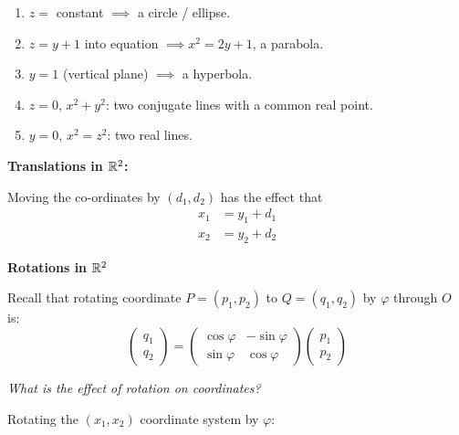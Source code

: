 \documentclass[10pt]{scrartcl}
\begin{document}
\begin{enumerate}
\item $z = $ constant $ \implies$ a circle / ellipse.
\item $z = y + 1$ into equation $\implies x^2 = 2y + 1$, a parabola.	
\item $y=1$ (vertical plane) $\implies$ a hyperbola.
\item $z = 0,\,x^2+y^2$: two conjugate lines with a common real point. 
\item $y = 0,\, x^2 = z^2$: two real lines.
\end{enumerate}\vsp



\textbf{Translations in $\mathbb{R}^2$:}

\begin{center}
\end{center}
Moving the co-ordinates by $(d_1,d_2)$ has the effect that
\begin{align*}
  x_1 &= y_1 + d_1\\
  x_2 &= y_2 + d_2
\end{align*}

\textbf{Rotations in $\mathbb{R}^2$}

Recall that rotating coordinate $P = (p_1,p_2)$ to $Q = (q_1,q_2)$ by $\varphi$ through $O$ is: 
\[
  \begin{pmatrix}
  q_1 \\ q_2	
  \end{pmatrix} = \begin{pmatrix}
 \cos\varphi & -\sin\varphi \\
 \sin\varphi & \cos\varphi 	
 \end{pmatrix}\begin{pmatrix}
	p_1 \\ p_2	
	\end{pmatrix}
\]

\emph{What is the effect of rotation on coordinates?} 

Rotating the $(x_1,x_2)$ coordinate system by $\varphi$:
\end{document}
